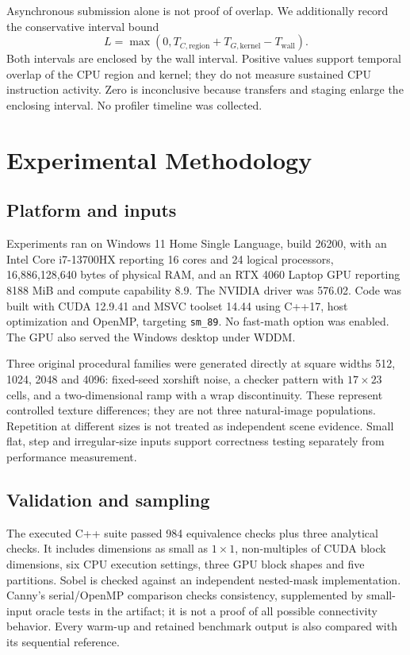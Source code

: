 \documentclass[conference]{IEEEtran}
\begin{document}
Asynchronous submission alone is not proof of overlap. We additionally record the conservative interval bound
\begin{equation}
L=\max(0,T_{C,\mathrm{region}}+T_{G,\mathrm{kernel}}-T_{\mathrm{wall}}).
\end{equation}
Both intervals are enclosed by the wall interval. Positive values support temporal overlap of the CPU region and kernel; they do not measure sustained CPU instruction activity. Zero is inconclusive because transfers and staging enlarge the enclosing interval. No profiler timeline was collected.

\section{Experimental Methodology}
\subsection{Platform and inputs}
Experiments ran on Windows 11 Home Single Language, build 26200, with an Intel Core i7-13700HX reporting 16 cores and 24 logical processors, 16,886,128,640 bytes of physical RAM, and an RTX 4060 Laptop GPU reporting 8188 MiB and compute capability 8.9. The NVIDIA driver was 576.02. Code was built with CUDA 12.9.41 and MSVC toolset 14.44 using C++17, host optimization and OpenMP, targeting \texttt{sm\_89}. No fast-math option was enabled. The GPU also served the Windows desktop under WDDM.

Three original procedural families were generated directly at square widths 512, 1024, 2048 and 4096: fixed-seed xorshift noise, a checker pattern with $17\times23$ cells, and a two-dimensional ramp with a wrap discontinuity. These represent controlled texture differences; they are not three natural-image populations. Repetition at different sizes is not treated as independent scene evidence. Small flat, step and irregular-size inputs support correctness testing separately from performance measurement.

\subsection{Validation and sampling}
The executed C++ suite passed 984 equivalence checks plus three analytical checks. It includes dimensions as small as $1\times1$, non-multiples of CUDA block dimensions, six CPU execution settings, three GPU block shapes and five partitions. Sobel is checked against an independent nested-mask implementation. Canny's serial/OpenMP comparison checks consistency, supplemented by small-input oracle tests in the artifact; it is not a proof of all possible connectivity behavior. Every warm-up and retained benchmark output is also compared with its sequential reference.
\end{document}
